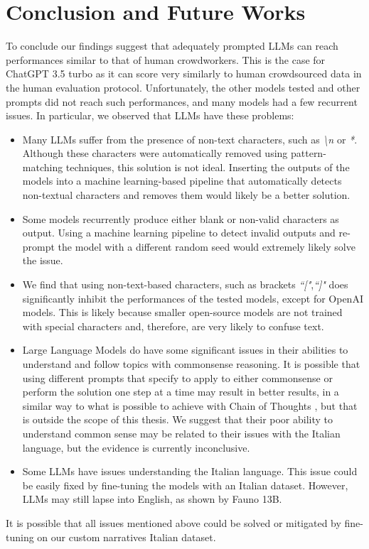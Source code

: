 \chapter{Conclusion and Future Works}
\label{cha:conclusion}
To conclude our findings suggest that adequately prompted LLMs can reach performances similar to that of human crowdworkers. This is the case for ChatGPT 3.5 turbo as it can score very similarly to human crowdsourced data in the human evaluation protocol.
Unfortunately, the other models tested and other prompts did not reach such performances, and many models had a few recurrent issues. In particular, we observed that LLMs have these problems:
\begin{itemize}
    \item Many LLMs suffer from the presence of non-text characters, such as \emph{\textbackslash n} or \emph{*}. Although these characters were automatically removed using pattern-matching techniques, this solution is not ideal. Inserting the outputs of the models into a machine learning-based pipeline that automatically detects non-textual characters and removes them would likely be a better solution.
    \item Some models recurrently produce either blank or non-valid characters as output. Using a machine learning pipeline to detect invalid outputs and re-prompt the model with a different random seed would extremely likely solve the issue.
    \item We find that using non-text-based characters, such as brackets \emph{``["},\emph{``]"} does significantly inhibit the performances of the tested models, except for OpenAI models. This is likely because smaller open-source models are not trained with special characters and, therefore, are very likely to confuse text.
    \item Large Language Models do have some significant issues in their abilities to understand and follow topics with commonsense reasoning. It is possible that using different prompts that specify to apply to either commonsense or perform the solution one step at a time may result in better results, in a similar way to what is possible to achieve with Chain of Thoughts \cite{wei2023chainofthought}, but that is outside the scope of this thesis. We suggest that their poor ability to understand common sense may be related to their issues with the Italian language, but the evidence is currently inconclusive.
    \item Some LLMs have issues understanding the Italian language. This issue could be easily fixed by fine-tuning the models with an Italian dataset. However, LLMs may still lapse into English, as shown by Fauno 13B.
\end{itemize}
It is possible that all issues mentioned above could be solved or mitigated by fine-tuning on our custom narratives Italian dataset.

